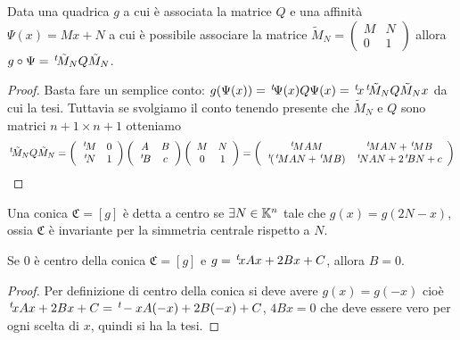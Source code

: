 \begin{lemma}\label{lem:cambioaffine}
	Data una quadrica $g$ a cui è associata la matrice $Q$ e una affinità $\Psi(x)=Mx+N$ a cui è possibile  associare la matrice
	$\tilde M_N = \left(\begin{smallmatrix}
M & N \\ 0 & 1
\end{smallmatrix}
\right)$ allora 
	$g\circ \Psi = \, ^{t}\!\tilde M_NQ \tilde M_N$.
\end{lemma}
\begin{proof}
	Basta fare un semplice conto: $g(\Psi(x))=\, ^{t}\!\Psi(x)Q \Psi(x) = \, ^{t}\!x\, ^{t}\!\tilde M_NQ \tilde M_N x$ da cui la tesi.
	Tuttavia se svolgiamo il conto tenendo presente che  $\tilde M_N$ e $Q$ sono matrici $n+1\times n+1$ otteniamo
	\[
		\tra{\tilde M_N}Q \tilde M_N = 
		\left(
			\begin{array}{cc}
			\tra{M} & 0\\
			\tra{N} & 1
			\end{array}
		\right)
		\left(
			\begin{array}{cc}
			A & B\\
			\tra{B} & c
			\end{array}
		\right)
		\left(
			\begin{array}{cc}
			M & N\\
			0 & 1
			\end{array}
		\right) =
		\left(
			\begin{array}{cc}
			\tra{M}AM & \tra{M}AN+\tra{M}B\\
			\tra{(\tra{M}AN+\tra{M}B)}& \tra{N}AN+2\tra{B}N+c
			\end{array}
		\right)
	\]

\end{proof}

\begin{definition}
	Una conica $\mathfrak{C}=[g]$ è detta a centro se $\exists N\in \mathbb K^n$ tale che $g(x)=g(2N-x)$, ossia $\mathfrak{C}$ è invariante per la
	simmetria centrale rispetto a $N$.
\end{definition}

\begin{lemma}\label{lem:centroconica}
	Se $0$ è centro della conica $\mathfrak{C}=[g]$ e $g=\, ^{t}\!xAx+2Bx+C$, allora $B=0$.
\end{lemma}

\begin{proof}
	Per definizione di centro della conica si deve avere  $g(x)=g(-x)$ cioè $\, ^{t}\!xAx+2Bx+C=\, ^{t}\!-xA(-x)+2B(-x)+C$, $4Bx=0$ che deve essere vero
	per ogni scelta di $x$, quindi si ha la tesi.
\end{proof}

